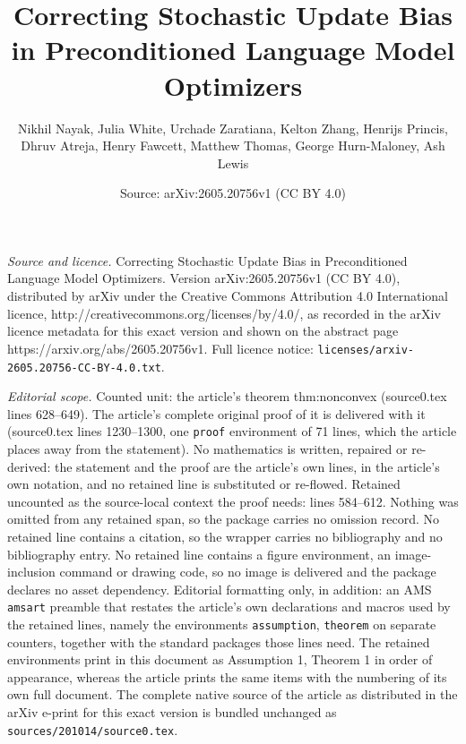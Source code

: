 \documentclass[10pt,a4paper]{amsart}
\title{Correcting Stochastic Update Bias in Preconditioned Language Model Optimizers}
\author{Nikhil Nayak, Julia White, Urchade Zaratiana, Kelton Zhang, Henrijs Princis, Dhruv Atreja, Henry Fawcett, Matthew Thomas, George Hurn-Maloney, Ash Lewis}
\date{Source: arXiv:2605.20756v1 (CC BY 4.0)}
\begin{document}
\maketitle

\noindent\emph{Source and licence.} Correcting Stochastic Update Bias in Preconditioned Language Model Optimizers. Version arXiv:2605.20756v1 (CC BY 4.0), distributed by arXiv under the Creative Commons Attribution 4.0 International licence, http://creativecommons.org/licenses/by/4.0/, as recorded in the arXiv licence metadata for this exact version and shown on the abstract page https://arxiv.org/abs/2605.20756v1. Full licence notice: \texttt{licenses/arxiv-2605.20756-CC-BY-4.0.txt}.\par\smallskip

\noindent\textit{Editorial scope.} Counted unit: the article's theorem thm:nonconvex (source0.tex lines 628--649). The article's complete original proof of it is delivered with it (source0.tex lines 1230--1300, one \texttt{proof} environment of 71 lines, which the article places away from the statement). No mathematics is written, repaired or re-derived: the statement and the proof are the article's own lines, in the article's own notation, and no retained line is substituted or re-flowed.  Retained uncounted as the source-local context the proof needs: lines 584--612.  Nothing was omitted from any retained span, so the package carries no omission record.  No retained line contains a citation, so the wrapper carries no bibliography and no bibliography entry.  No retained line contains a figure environment, an image-inclusion command or drawing code, so no image is delivered and the package declares no asset dependency.  Editorial formatting only, in addition: an AMS \texttt{amsart} preamble that restates the article's own declarations and macros used by the retained lines, namely the environments \texttt{assumption}, \texttt{theorem} on separate counters, together with the standard packages those lines need.  The retained environments print in this document as Assumption 1, Theorem 1 in order of appearance, whereas the article prints the same items with the numbering of its own full document.  The complete native source of the article as distributed in the arXiv e-print for this exact version is bundled unchanged as \texttt{sources/201014/source0.tex}.
\end{document}
